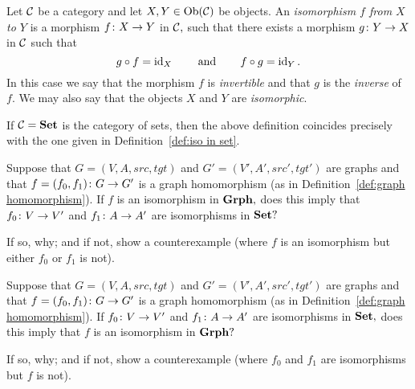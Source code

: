 \documentclass[../main/CT4S-EN-RU]{subfiles}
\begin{document}
\begin{blockRUS}
\end{blockRUS}

\begin{definitionENG}
Let $\mathcal{C}$ be a category and let $X,Y\in\operatorname{Ob}(\mathcal{C})$ be objects. An {\em isomorphism $f$ from $X$ to $Y$} is a morphism $f\colon X\rightarrow Y$ in $\mathcal{C},$ such that there exists a morphism $g\colon Y\rightarrow X$ in $\mathcal{C}$ such that $$g\circ f=\operatorname{id}_X\hspace{.3in}\textnormal{and}\hspace{.3in} f\circ g=\operatorname{id}_Y.$$ In this case we say that the morphism $f$ is {\em invertible} and that $g$ is the {\em inverse} of $f.$ We may also say that the objects $X$ and $Y$ are {\em isomorphic}.
\end{definitionENG}

\begin{definitionRUS}
\end{definitionRUS}

\begin{exampleENG}
If $\mathcal{C}={\mathbf{Set}}$ is the category of sets, then the above definition coincides precisely with the one given in Definition~\ref{def:iso in set}.
\end{exampleENG}

\begin{exampleRUS}
\end{exampleRUS}

\begin{exerciseENG}
Suppose that $G=(V,A,src,tgt)$ and $G'=(V',A',src',tgt')$ are graphs and that $f=(f_0,f_1)\colon G\rightarrow G'$ is a graph homomorphism (as in Definition~\ref{def:graph homomorphism}). 
\sexc If $f$ is an isomorphism in ${\mathbf{Grph}},$ does this imply that $f_0\colon V\rightarrow V'$ and $f_1\colon A\rightarrow A'$ are isomorphisms in ${\mathbf{Set}}?$
\item  If so, why; and if not, show a counterexample (where $f$ is an isomorphism but either $f_0$ or $f_1$ is not).
\endsexc
\end{exerciseENG}

\begin{exerciseRUS}
\end{exerciseRUS}

\begin{exerciseENG}
Suppose that $G=(V,A,src,tgt)$ and $G'=(V',A',src',tgt')$ are graphs and that $f=(f_0,f_1)\colon G\rightarrow G'$ is a graph homomorphism (as in Definition~\ref{def:graph homomorphism}). 
\sexc If $f_0\colon V\rightarrow V'$ and $f_1\colon A\rightarrow A'$ are isomorphisms in ${\mathbf{Set}},$ does this imply that $f$ is an isomorphism in ${\mathbf{Grph}}?$
\item If so, why; and if not, show a counterexample (where $f_0$ and $f_1$ are isomorphisms but $f$ is not).
\endsexc
\end{exerciseENG}
\end{document}
